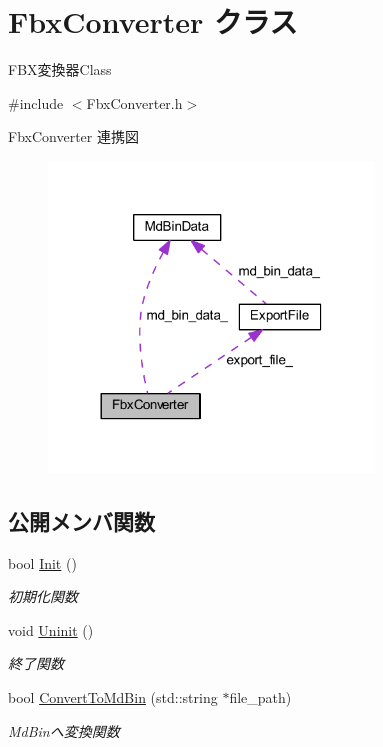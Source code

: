 \hypertarget{class_fbx_converter}{}\section{Fbx\+Converter クラス}
\label{class_fbx_converter}


F\+B\+X変換器\+Class  




{\ttfamily \#include $<$Fbx\+Converter.\+h$>$}



Fbx\+Converter 連携図\nopagebreak
\begin{figure}[H]
\begin{center}
\leavevmode
\includegraphics[width=245pt]{class_fbx_converter__coll__graph}
\end{center}
\end{figure}
\subsection*{公開メンバ関数}
\begin{DoxyCompactItemize}
\item 
bool \mbox{\hyperlink{class_fbx_converter_ad42745849ed5fbd2a6b332004a21a667}{Init}} ()
\begin{DoxyCompactList}\small\item\em 初期化関数 \end{DoxyCompactList}\item 
void \mbox{\hyperlink{class_fbx_converter_ab41f9b165cb34a294bb2c5da778f542b}{Uninit}} ()
\begin{DoxyCompactList}\small\item\em 終了関数 \end{DoxyCompactList}\item 
bool \mbox{\hyperlink{class_fbx_converter_aecd6ebf6aec9616bd609f6ebfc3a557e}{Convert\+To\+Md\+Bin}} (std\+::string $\ast$file\+\_\+path)
\begin{DoxyCompactList}\small\item\em Md\+Binへ変換関数 \end{DoxyCompactList}\end{DoxyCompactItemize}

